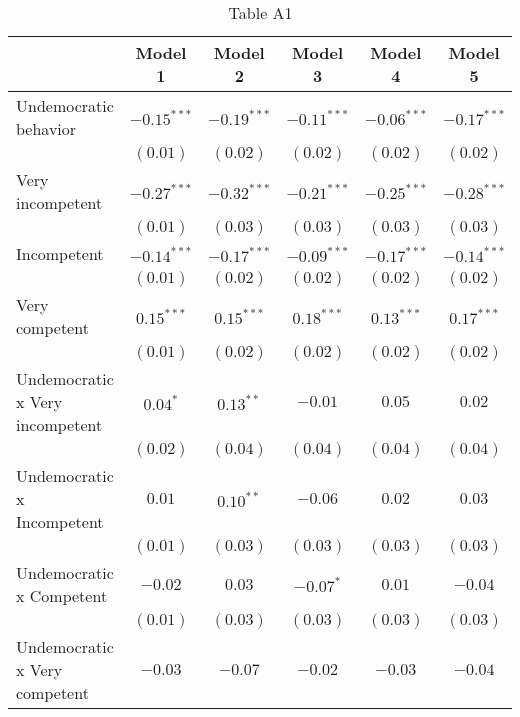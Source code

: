 
\begin{table}[!htbp]
\caption{Table A1}
\begin{center}
\begin{tabular}{l c c c c c}
\hline
 & Model 1 & Model 2 & Model 3 & Model 4 & Model 5 \\
\hline
Undemocratic behavior           & $-0.15^{***}$ & $-0.19^{***}$ & $-0.11^{***}$ & $-0.06^{***}$ & $-0.17^{***}$ \\
                                & $(0.01)$      & $(0.02)$      & $(0.02)$      & $(0.02)$      & $(0.02)$      \\
Very incompetent                & $-0.27^{***}$ & $-0.32^{***}$ & $-0.21^{***}$ & $-0.25^{***}$ & $-0.28^{***}$ \\
                                & $(0.01)$      & $(0.03)$      & $(0.03)$      & $(0.03)$      & $(0.03)$      \\
Incompetent                     & $-0.14^{***}$ & $-0.17^{***}$ & $-0.09^{***}$ & $-0.17^{***}$ & $-0.14^{***}$ \\
                                & $(0.01)$      & $(0.02)$      & $(0.02)$      & $(0.02)$      & $(0.02)$      \\
Very competent                  & $0.15^{***}$  & $0.15^{***}$  & $0.18^{***}$  & $0.13^{***}$  & $0.17^{***}$  \\
                                & $(0.01)$      & $(0.02)$      & $(0.02)$      & $(0.02)$      & $(0.02)$      \\
Undemocratic x Very incompetent & $0.04^{*}$    & $0.13^{**}$   & $-0.01$       & $0.05$        & $0.02$        \\
                                & $(0.02)$      & $(0.04)$      & $(0.04)$      & $(0.04)$      & $(0.04)$      \\
Undemocratic x Incompetent      & $0.01$        & $0.10^{**}$   & $-0.06$       & $0.02$        & $0.03$        \\
                                & $(0.01)$      & $(0.03)$      & $(0.03)$      & $(0.03)$      & $(0.03)$      \\
Undemocratic x Competent        & $-0.02$       & $0.03$        & $-0.07^{*}$   & $0.01$        & $-0.04$       \\
                                & $(0.01)$      & $(0.03)$      & $(0.03)$      & $(0.03)$      & $(0.03)$      \\
Undemocratic x Very competent   & $-0.03$       & $-0.07$       & $-0.02$       & $-0.03$       & $-0.04$       \\

\end{tabular}
\end{center}
\end{table}

